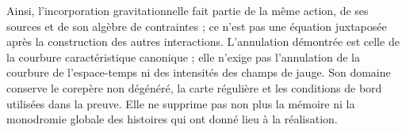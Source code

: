 Ainsi, l’incorporation gravitationnelle fait partie de la même action, de ses sources et de son algèbre de contraintes ; ce n’est pas une équation juxtaposée après la construction des autres interactions. L’annulation démontrée est celle de la courbure caractéristique canonique ; elle n’exige pas l’annulation de la courbure de l’espace-temps ni des intensités des champs de jauge. Son domaine conserve le corepère non dégénéré, la carte régulière et les conditions de bord utilisées dans la preuve. Elle ne supprime pas non plus la mémoire ni la monodromie globale des histoires qui ont donné lieu à la réalisation.
